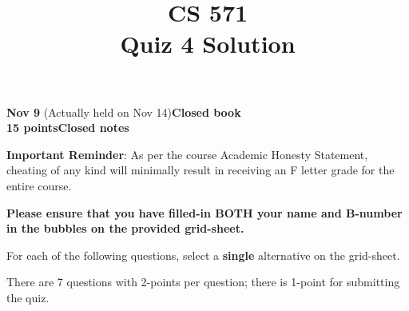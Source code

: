 \documentclass[12pt]{article}
\title{CS 571\\Quiz 4 Solution}
\date{}
\begin{document}
\maketitle

\begin{flushleft}
  \textbf{Nov 9}   (Actually held on Nov 14)\hfill\textbf{Closed book}\\
\textbf{15 points}\hfill\textbf{Closed notes}\\

\vspace{0.5cm}

\textbf{Important Reminder}: As per the course Academic Honesty
Statement, cheating of any kind will minimally result in receiving an
F letter grade for the entire course.


\end{flushleft}

\textbf{Please ensure that you have filled-in BOTH your name and
  B-number in the bubbles on the provided grid-sheet.}

For each of the following questions, select a \textbf{single}
alternative on the grid-sheet.  

There are 7 questions with 2-points per question; there is 1-point
for submitting the quiz.
\end{document}
